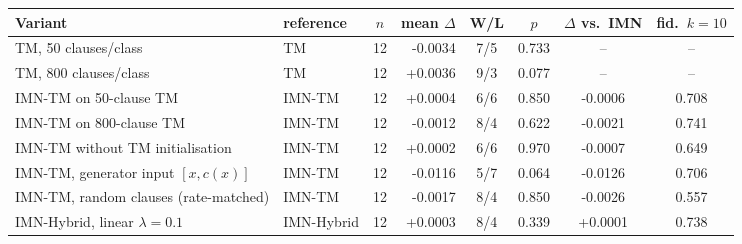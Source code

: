 \begin{tabular}{llcrcccc}
\toprule
Variant & reference & $n$ & mean $\Delta$ & W/L & $p$ & $\Delta$ vs.\ IMN & fid.\ $k{=}10$ \\
\midrule
TM, 50 clauses/class & TM & 12 & -0.0034 & 7/5 & 0.733 & -- & -- \\
TM, 800 clauses/class & TM & 12 & +0.0036 & 9/3 & 0.077 & -- & -- \\
IMN-TM on 50-clause TM & IMN-TM & 12 & +0.0004 & 6/6 & 0.850 & -0.0006 & 0.708 \\
IMN-TM on 800-clause TM & IMN-TM & 12 & -0.0012 & 8/4 & 0.622 & -0.0021 & 0.741 \\
IMN-TM without TM initialisation & IMN-TM & 12 & +0.0002 & 6/6 & 0.970 & -0.0007 & 0.649 \\
IMN-TM, generator input $[x, c(x)]$ & IMN-TM & 12 & -0.0116 & 5/7 & 0.064 & -0.0126 & 0.706 \\
IMN-TM, random clauses (rate-matched) & IMN-TM & 12 & -0.0017 & 8/4 & 0.850 & -0.0026 & 0.557 \\
IMN-Hybrid, linear $\lambda=0.1$ & IMN-Hybrid & 12 & +0.0003 & 8/4 & 0.339 & +0.0001 & 0.738 \\
\bottomrule
\end{tabular}
